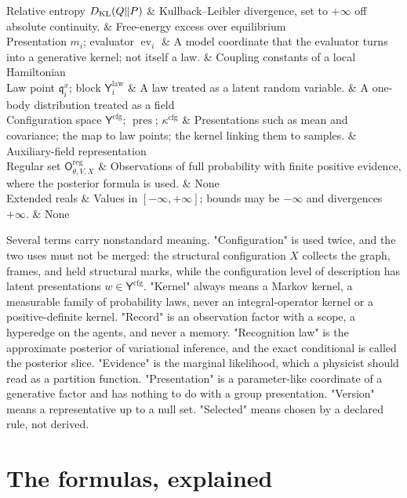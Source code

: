 \begin{decoder}
Relative entropy $D_{\mathrm{KL}}(Q\Vert P)$ & Kullback--Leibler divergence, set to $+\infty$ off absolute continuity. & Free-energy excess over equilibrium \\
Presentation $m_i$; evaluator $\operatorname{ev}_i$ & A model coordinate that the evaluator turns into a generative kernel; not itself a law. & Coupling constants of a local Hamiltonian \\
Law point $\mathfrak q_i^x$; block $\mathsf Y_i^{\mathrm{law}}$ & A law treated as a latent random variable. & A one-body distribution treated as a field \\
Configuration space $\mathsf Y^{\mathrm{cfg}}$; $\operatorname{pres}$; $\kappa^{\mathrm{cfg}}$ & Presentations such as mean and covariance; the map to law points; the kernel linking them to samples. & Auxiliary-field representation \\
Regular set $\mathsf O^{\mathrm{reg}}_{\theta,V,X}$ & Observations of full probability with finite positive evidence, where the posterior formula is used. & None \\
Extended reals & Values in $[-\infty,+\infty]$; bounds may be $-\infty$ and divergences $+\infty$. & None \\
\end{decoder}

Several terms carry nonstandard meaning. "Configuration" is used twice, and the two uses must not be merged: the
structural configuration $X$ collects the graph, frames, and held structural marks, while the configuration level of
description has latent presentations $w\in\mathsf Y^{\mathrm{cfg}}$. "Kernel" always means a Markov kernel, a
measurable family of probability laws, never an integral-operator kernel or a positive-definite kernel.
"Record" is an observation factor with a scope, a hyperedge on the agents, and never a memory. "Recognition
law" is the approximate posterior of variational inference, and the exact conditional is called the posterior
slice. "Evidence" is the marginal likelihood, which a physicist should read as a partition function.
"Presentation" is a parameter-like coordinate of a generative factor and has nothing to do with a group
presentation. "Version" means a representative up to a null set. "Selected" means chosen by a declared rule,
not derived.

\section{The formulas, explained}
\label{comp:ch03-formulas}


